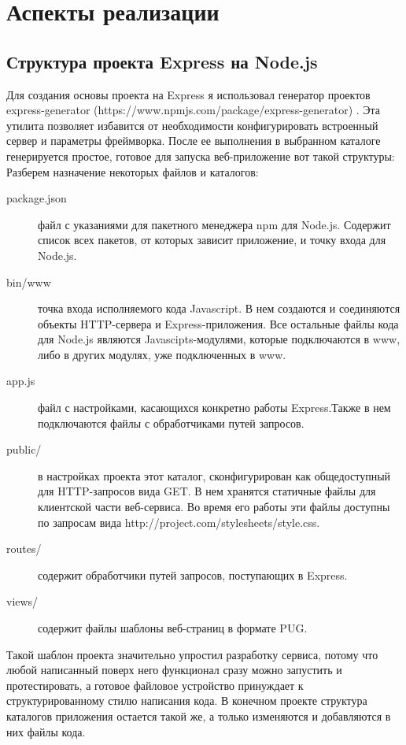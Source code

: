 \section{Аспекты реализации}
\subsection{Структура проекта Express на Node.js}
Для создания основы проекта на Express я использовал генератор проектов express-generator (https://www.npmjs.com/package/express-generator) . Эта утилита позволяет избавится от необходимости конфигурировать встроенный сервер и параметры фреймворка. После ее выполнения в выбранном каталоге генерируется простое, готовое для запуска  веб-приложение вот такой структуры:
 Разберем назначение некоторых файлов и каталогов:
 \begin{description}
 	\item[package.json] файл с указаниями для пакетного менеджера npm для Node.js. Содержит список всех пакетов, от которых зависит приложение, и точку входа для Node.js.  
 	\item[bin/www] точка входа исполняемого кода Javascript. В нем создаются и соединяются объекты HTTP-сервера и Express-приложения. Все остальные файлы кода для Node.js являются Javascipts-модулями, которые подключаются в www, либо в других модулях, уже подключенных в www.
 	\item[app.js] файл с настройками, касающихся конкретно работы Express.Также в нем подключаются файлы с обработчиками путей запросов.   
 	\item[public/] в настройках проекта этот каталог, сконфигурирован как общедоступный для  HTTP-запросов вида GET. В нем хранятся статичные файлы для клиентской части веб-сервиса. Во время его работы эти файлы доступны по запросам вида http://project.com/stylesheets/style.css.
 	\item[routes/]   содержит обработчики путей запросов, поступающих в Express.
 	\item[views/]   содержит файлы шаблоны веб-страниц в формате PUG.  
 \end{description}


Такой шаблон проекта значительно упростил разработку сервиса, потому что любой написанный поверх него функционал сразу можно запустить и протестировать, а готовое файловое устройство принуждает к структурированному стилю написания кода. В конечном проекте структура каталогов приложения остается такой же, а только изменяются и добавляются в них файлы кода.      

